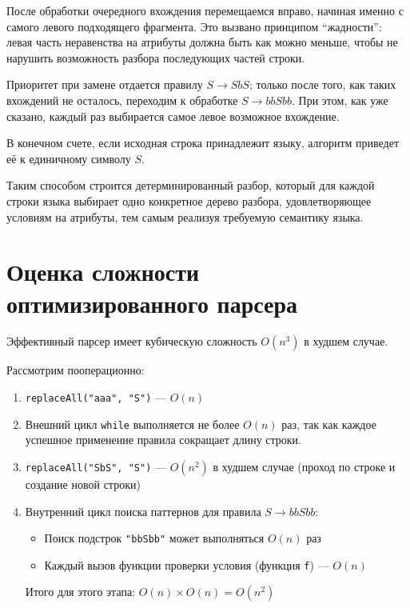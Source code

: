 \documentclass{article}
\begin{document}
После обработки очередного вхождения перемещаемся вправо, начиная именно с самого левого подходящего фрагмента.
Это вызвано принципом ``жадности'': левая часть неравенства на атрибуты должна быть как можно меньше,
чтобы не нарушить возможность разбора последующих частей строки.

Приоритет при замене отдается правилу $S \rightarrow SbS$;
только после того, как таких вхождений не осталось, переходим к обработке $S \rightarrow bbSbb$.
При этом, как уже сказано, каждый раз выбирается самое левое возможное вхождение.

В конечном счете, если исходная строка принадлежит языку, алгоритм приведет её к единичному символу $S$.

Таким способом строится детерминированный разбор,
который для каждой строки языка выбирает одно конкретное дерево разбора,
удовлетворяющее условиям на атрибуты, тем самым реализуя требуемую семантику языка.

\section{Оценка сложности оптимизированного парсера}

Эффективный парсер имеет кубическую сложность $O(n^3)$ в худшем случае.

Рассмотрим пооперационно:

\begin{enumerate}
    \item \texttt{replaceAll("aaa", "S")} — $O(n)$
    
    \item Внешний цикл \texttt{while} выполняется не более $O(n)$ раз, так как каждое успешное применение правила сокращает длину строки.
    
    \item \texttt{replaceAll("SbS", "S")} — $O(n^2)$ в худшем случае (проход по строке и создание новой строки)
    
    \item Внутренний цикл поиска паттернов для правила $S \rightarrow bbSbb$:
    \begin{itemize}
        \item Поиск подстрок \texttt{"bbSbb"} может выполняться $O(n)$ раз
        \item Каждый вызов функции проверки условия (функция \texttt{f}) — $O(n)$
    \end{itemize}
    Итого для этого этапа: $O(n) \times O(n) = O(n^2)$
\end{enumerate}
\end{document}
